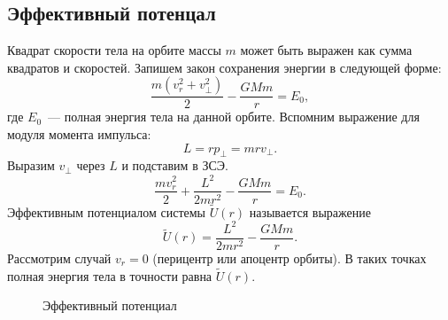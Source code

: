 \subsection{Эффективный потенцал}

Квадрат скорости тела на орбите массы $m$ может быть выражен как сумма квадратов  и  скоростей. Запишем закон сохранения энергии в следующей форме:
\begin{equation*}
	\frac{m(v^2_r + v^2_{\perp})}{2} - \frac{GMm}{r} = E_0,
\end{equation*}
где $E_0$~--- полная энергия тела на данной орбите. Вспомним выражение для модуля момента импульса:
\begin{equation}
	L = r p_{\perp} = mr v_{\perp}.
\end{equation}
Выразим $v_{\perp}$ через $L$ и подставим в ЗСЭ.
\begin{equation}
	\frac{m v^2_r}{2} + \frac{L^2}{2mr^2} - \frac{GMm}{r} = E_0.
\end{equation}
Эффективным потенциалом системы $\tilde{U}(r)$ называется выражение
\begin{equation}
	\tilde{U}(r) = \frac{L^2}{2mr^2} - \frac{GMm}{r}.
\end{equation}
Рассмотрим случай $v_r=0$ (перицентр или апоцентр орбиты). В таких точках полная энергия тела в точности равна $\tilde{U}(r)$.

\begin{wrapfigure}[8]{r}{0.3\tw}
    \centering
    \vspace{-0.8pc}
    \caption{Эффективный потенциал}
    \label{pic:effitient-potential-plot}
\end{wrapfigure} 

